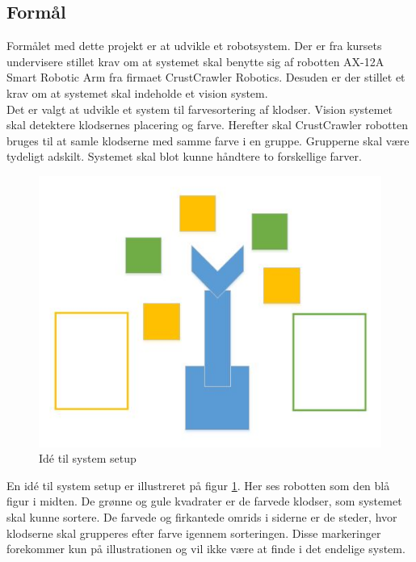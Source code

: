 \subsection{Formål}

Formålet med dette projekt er at udvikle et robotsystem.
Der er fra kursets undervisere stillet krav om at systemet skal benytte sig af robotten AX-12A Smart Robotic Arm fra firmaet CrustCrawler Robotics.
Desuden er der stillet et krav om at systemet skal indeholde et vision system. \\

Det er valgt at udvikle et system til farvesortering af klodser.
Vision systemet skal detektere klodsernes placering og farve.
Herefter skal CrustCrawler robotten bruges til at samle klodserne med samme farve i en gruppe.
Grupperne skal være tydeligt adskilt.
Systemet skal blot kunne håndtere to forskellige farver. \\


\begin{figure}[h]
\centering
\includegraphics[scale=0.65]{images/purpose}
\caption{Idé til system setup}
\label{fig:purpose}
\end{figure}

En idé til system setup er illustreret på figur \ref{fig:purpose}.
Her ses robotten som den blå figur i midten. De grønne og gule kvadrater er de farvede klodser, som systemet skal kunne sortere. 
De farvede og firkantede omrids i siderne er de steder, hvor klodserne skal grupperes efter farve igennem sorteringen.
Disse markeringer forekommer kun på illustrationen og vil ikke være at finde i det endelige system. \\